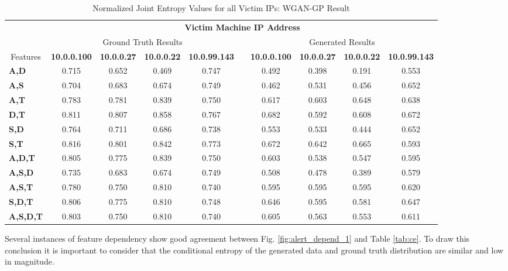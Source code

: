 \begin{table}[!htbp]
	\caption{Normalized Joint Entropy Values for all Victim IPs: WGAN-GP Result}
	\label{tab:je}
	\centering
	\begin{adjustbox}{angle=90}
		\begin{tabular}{l|c|c|c|c|c|c|c|c|c|}
			\multicolumn{1}{c|}{} & \multicolumn{9}{c|}{\textbf{Victim Machine IP Address}} \\
			\multicolumn{1}{c|}{} & \multicolumn{4}{c|}{Ground Truth Results} &  & \multicolumn{4}{c|}{Generated Results} \\
			\multicolumn{1}{c|}{Features} & \textbf{10.0.0.100} & \textbf{10.0.0.27} & \textbf{10.0.0.22} & \textbf{10.0.99.143} &  & \textbf{10.0.0.100} & \textbf{10.0.0.27} & \textbf{10.0.0.22} & \textbf{10.0.99.143} \\ \hline
			\textbf{A,D} & 0.715 & 0.652 & 0.469 & 0.747 &  & 0.492 & 0.398 & 0.191 & 0.553 \\
			\textbf{A,S} & 0.704 & 0.683 & 0.674 & 0.749 &  & 0.462 & 0.531 & 0.456 & 0.652 \\
			\textbf{A,T} & 0.783 & 0.781 & 0.839 & 0.750 &  & 0.617 & 0.603 & 0.648 & 0.638 \\
			\textbf{D,T} & 0.811 & 0.807 & 0.858 & 0.767 &  & 0.682 & 0.592 & 0.608 & 0.672 \\
			\textbf{S,D} & 0.764 & 0.711 & 0.686 & 0.738 &  & 0.553 & 0.533 & 0.444 & 0.652 \\
			\textbf{S,T} & 0.816 & 0.801 & 0.842 & 0.773 &  & 0.672 & 0.642 & 0.665 & 0.593 \\ \hline
			\textbf{A,D,T} & 0.805 & 0.775 & 0.839 & 0.750 &  & 0.603 & 0.538 & 0.547 & 0.595 \\
			\textbf{A,S,D} & 0.735 & 0.683 & 0.674 & 0.749 &  & 0.508 & 0.478 & 0.389 & 0.579 \\
			\textbf{A,S,T} & 0.780 & 0.750 & 0.810 & 0.740 &  & 0.595 & 0.595 & 0.595 & 0.620 \\
			\textbf{S,D,T} & 0.806 & 0.775 & 0.810 & 0.748 &  & 0.646 & 0.595 & 0.581 & 0.647 \\ \hline
			\textbf{A,S,D,T} & 0.803 & 0.750 & 0.810 & 0.740 &  & 0.605 & 0.563 & 0.553 & 0.611
			\end{tabular}
	\end{adjustbox}
\end{table}

Several instances of feature dependency show good agreement between Fig. \ref{fig:alert_depend_1} and Table \ref{tab:ce}. To draw this conclusion it is important to consider that the conditional entropy of the generated data and ground truth distribution are similar and low in magnitude.

